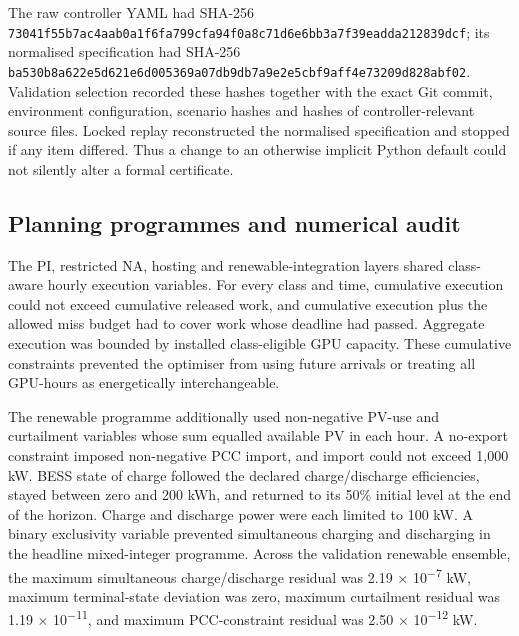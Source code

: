 \documentclass[10pt,a4paper]{article}
\begin{document}
The raw controller YAML had SHA-256 \texttt{7304\allowbreak{}1f55\allowbreak{}b7ac\allowbreak{}4aab\allowbreak{}0a1f\allowbreak{}6fa7\allowbreak{}99cf\allowbreak{}a94f\allowbreak{}0a8c\allowbreak{}71d6\allowbreak{}e6bb\allowbreak{}3a7f\allowbreak{}39ea\allowbreak{}dda2\allowbreak{}1283\allowbreak{}9dcf}; its normalised specification had SHA-256 \texttt{ba53\allowbreak{}0b8a\allowbreak{}622e\allowbreak{}5d62\allowbreak{}1e6d\allowbreak{}0053\allowbreak{}69a0\allowbreak{}7db9\allowbreak{}db7a\allowbreak{}9e2e\allowbreak{}5cbf\allowbreak{}9aff\allowbreak{}4e73\allowbreak{}209d\allowbreak{}828a\allowbreak{}bf02}. Validation selection recorded these hashes together with the exact Git commit, environment configuration, scenario hashes and hashes of controller-relevant source files. Locked replay reconstructed the normalised specification and stopped if any item differed. Thus a change to an otherwise implicit Python default could not silently alter a formal certificate.


\subsection{Planning programmes and numerical audit}

The PI, restricted NA, hosting and renewable-integration layers shared class-aware hourly execution variables. For every class and time, cumulative execution could not exceed cumulative released work, and cumulative execution plus the allowed miss budget had to cover work whose deadline had passed. Aggregate execution was bounded by installed class-eligible GPU capacity. These cumulative constraints prevented the optimiser from using future arrivals or treating all GPU-hours as energetically interchangeable.


The renewable programme additionally used non-negative PV-use and curtailment variables whose sum equalled available PV in each hour. A no-export constraint imposed non-negative PCC import, and import could not exceed 1,000 kW. BESS state of charge followed the declared charge/discharge efficiencies, stayed between zero and 200 kWh, and returned to its 50\% initial level at the end of the horizon. Charge and discharge power were each limited to 100 kW. A binary exclusivity variable prevented simultaneous charging and discharging in the headline mixed-integer programme. Across the validation renewable ensemble, the maximum simultaneous charge/discharge residual was 2.19 × 10\textsuperscript{−7} kW, maximum terminal-state deviation was zero, maximum curtailment residual was 1.19 × 10\textsuperscript{−11}, and maximum PCC-constraint residual was 2.50 × 10\textsuperscript{−12} kW.
\end{document}
